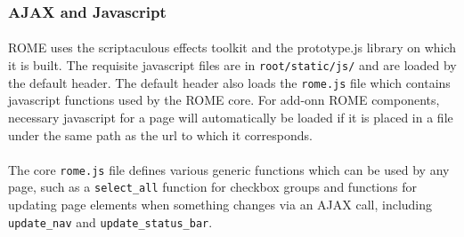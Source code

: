 \subsubsection{AJAX and Javascript}
\label{sec:view_javascript}

\paragraph{}
ROME uses the scriptaculous effects toolkit and the prototype.js library on which it is built. The requisite javascript files are in \texttt{root/static/js/} and are loaded by the default header. The default header also loads the \texttt{rome.js} file which contains javascript functions used by the ROME core. For add-onn ROME components, necessary javascript for a page will automatically be loaded if it is placed in a file under the same path as the url to which it corresponds. 

\paragraph{}
The core \texttt{rome.js} file defines various generic functions which can be used by any page, such as a \texttt{select\_all} function for checkbox groups and functions for updating  page elements when something changes via an AJAX call, including \texttt{update\_nav} and \texttt{update\_status\_bar}.

